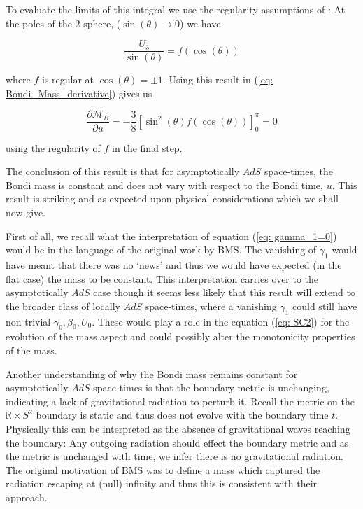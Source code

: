 \documentclass[a4paper,11pt]{article}
\numberwithin{equation}{section}
\begin{document}
\noindent To evaluate the limits of this integral we use the regularity assumptions of \cite{Bondi:1962px}: At the poles of the 2-sphere, ($\sin(\theta) \rightarrow 0$) we have 

\begin{equation}
\frac{U_3}{\sin(\theta)}= f(\cos(\theta)) 
\end{equation}

\noindent where $f$ is regular at $\cos(\theta)=\pm 1$. Using this result in (\ref{eq: Bondi_Mass_derivative}) gives us 

\begin{equation}
\frac{ \partial \mathcal{M}_B }{\partial u}=-\frac{3}{8}[\sin^2(\theta) f(\cos(\theta))]^{\pi}_{0}=0
\end{equation}

\noindent using the regularity of $f$ in the final step. \par

The conclusion of this result is that for asymptotically $AdS$ space-times, the Bondi mass is constant and does not vary with respect to the Bondi time, $u$. This result is striking and as expected upon physical considerations which we shall now give.  \par

First of all, we recall what the interpretation of equation (\ref{eq: gamma_1=0}) would be in the language of the original work by BMS. The vanishing of $\gamma_1$ would have meant that there was no `news' and thus we would have expected (in the flat case) the mass to be constant. This interpretation carries over to the asymptotically $AdS$ case though it seems less likely that this result will extend to the broader class of locally $AdS$ space-times, where a vanishing $\gamma_1$ could still have non-trivial $\gamma_0, \beta_0, U_0$. These would play a role in the equation (\ref{eq: SC2}) for the evolution of the mass aspect and could possibly alter the monotonicity properties of the mass. \par

Another understanding of why the Bondi mass remains constant for asymptotically $AdS$ space-times is that the boundary metric is unchanging, indicating a lack of gravitational radiation to perturb it. Recall the metric on the $\mathbb{R} \times S^2$ boundary is static and thus does not evolve with the boundary time $t$. Physically this can be interpreted as the absence of gravitational waves reaching the boundary: Any outgoing radiation should effect the boundary metric and as the metric is unchanged with time, we infer there is no gravitational radiation. The original motivation of BMS was to define a mass which captured the radiation escaping at (null) infinity and thus this is consistent with their approach.  
\end{document}
